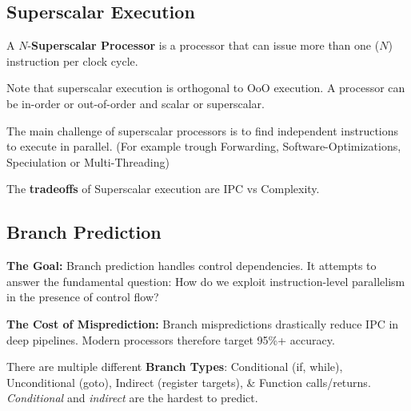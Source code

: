 \subsection{Superscalar Execution}

\begin{definition}
	A $N$-\textbf{Superscalar Processor} is a processor that can issue more than one ($N$) instruction per clock cycle.
\end{definition}

\begin{remark}
	Note that superscalar execution is orthogonal to OoO execution. A processor can be in-order or out-of-order and scalar or superscalar.
\end{remark}

\begin{important}
	The main challenge of superscalar processors is to find independent instructions to execute in parallel. (For example trough Forwarding, Software-Optimizations, Speciulation or Multi-Threading)
\end{important}

\begin{remark}
	The \textbf{tradeoffs} of Superscalar execution are IPC vs Complexity.
\end{remark}

\subsection{Branch Prediction}

\begin{remark}
	\textbf{The Goal:} Branch prediction handles control dependencies. It attempts to answer the fundamental question: How do we exploit instruction-level parallelism in the presence of control flow?
\end{remark}

\begin{remark}
	\textbf{The Cost of Misprediction:} Branch mispredictions drastically reduce IPC in deep pipelines. Modern processors therefore target 95\%+ accuracy.
\end{remark}

\begin{definition}
	There are multiple different \textbf{Branch Types}: Conditional (if, while), Unconditional (goto), Indirect (register targets), \& Function calls/returns. \textit{Conditional} and \textit{indirect} are the hardest to predict.
\end{definition}

